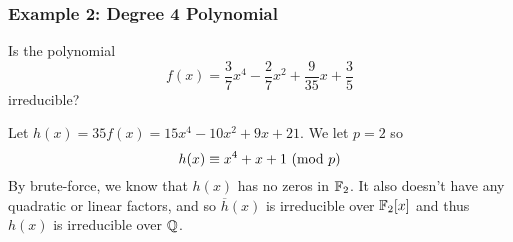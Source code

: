 \documentclass[letterpaper]{article}
\begin{document}
\subsubsection{Example 2: Degree 4 Polynomial}
Is the polynomial
\[f(x) = \frac{3}{7}x^4 - \frac{2}{7}x^2 + \frac{9}{35}x + \frac{3}{5}\]
irreducible?

\begin{mdframed}[]
    Let $h(x) = 35f(x) = 15x^4 - 10x^2 + 9x + 21$. We let $p = 2$ so 
    \[h(x) \equiv x^4 + x + 1 \ (\mathrm{mod}\ p)\]
    By brute-force, we know that $h(x)$ has no zeros in $\mathbb{F}_2$. It also doesn't have any quadratic or linear factors, and so $\overline{h}(x)$ is irreducible over $\mathbb{F}_2[x]$ and thus $h(x)$ is irreducible over $\mathbb{Q}$. 
\end{mdframed}
\end{document}
